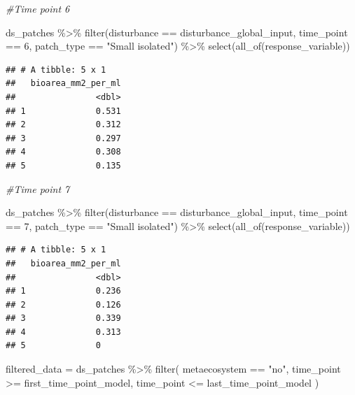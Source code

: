 \documentclass[
]{article}
\newenvironment{Shaded}{\begin{snugshade}}{\end{snugshade}}
\newcommand{\CommentTok}[1]{\textcolor[rgb]{0.56,0.35,0.01}{\textit{#1}}}
\newcommand{\DecValTok}[1]{\textcolor[rgb]{0.00,0.00,0.81}{#1}}
\newcommand{\FunctionTok}[1]{\textcolor[rgb]{0.00,0.00,0.00}{#1}}
\newcommand{\NormalTok}[1]{#1}
\newcommand{\OtherTok}[1]{\textcolor[rgb]{0.56,0.35,0.01}{#1}}
\newcommand{\SpecialCharTok}[1]{\textcolor[rgb]{0.00,0.00,0.00}{#1}}
\newcommand{\StringTok}[1]{\textcolor[rgb]{0.31,0.60,0.02}{#1}}
\begin{document}
\begin{Shaded}
\begin{Highlighting}[]
\CommentTok{\#Time point 6}

\NormalTok{ds\_patches }\SpecialCharTok{\%\textgreater{}\%}
  \FunctionTok{filter}\NormalTok{(disturbance }\SpecialCharTok{==}\NormalTok{ disturbance\_global\_input,}
\NormalTok{         time\_point }\SpecialCharTok{==} \DecValTok{6}\NormalTok{,}
\NormalTok{         patch\_type }\SpecialCharTok{==} \StringTok{"Small isolated"}\NormalTok{) }\SpecialCharTok{\%\textgreater{}\%}
  \FunctionTok{select}\NormalTok{(}\FunctionTok{all\_of}\NormalTok{(response\_variable))}
\end{Highlighting}
\end{Shaded}

\begin{verbatim}
## # A tibble: 5 x 1
##   bioarea_mm2_per_ml
##                <dbl>
## 1              0.531
## 2              0.312
## 3              0.297
## 4              0.308
## 5              0.135
\end{verbatim}

\begin{Shaded}
\begin{Highlighting}[]
\CommentTok{\#Time point 7}

\NormalTok{ds\_patches }\SpecialCharTok{\%\textgreater{}\%}
  \FunctionTok{filter}\NormalTok{(disturbance }\SpecialCharTok{==}\NormalTok{ disturbance\_global\_input,}
\NormalTok{         time\_point }\SpecialCharTok{==} \DecValTok{7}\NormalTok{,}
\NormalTok{         patch\_type }\SpecialCharTok{==} \StringTok{"Small isolated"}\NormalTok{) }\SpecialCharTok{\%\textgreater{}\%}
  \FunctionTok{select}\NormalTok{(}\FunctionTok{all\_of}\NormalTok{(response\_variable))}
\end{Highlighting}
\end{Shaded}

\begin{verbatim}
## # A tibble: 5 x 1
##   bioarea_mm2_per_ml
##                <dbl>
## 1              0.236
## 2              0.126
## 3              0.339
## 4              0.313
## 5              0
\end{verbatim}

\begin{Shaded}
\begin{Highlighting}[]
\NormalTok{filtered\_data }\OtherTok{=}\NormalTok{ ds\_patches }\SpecialCharTok{\%\textgreater{}\%}
  \FunctionTok{filter}\NormalTok{(}
\NormalTok{    metaecosystem }\SpecialCharTok{==} \StringTok{"no"}\NormalTok{,}
\NormalTok{    time\_point }\SpecialCharTok{\textgreater{}=}\NormalTok{ first\_time\_point\_model,}
\NormalTok{    time\_point }\SpecialCharTok{\textless{}=}\NormalTok{ last\_time\_point\_model}
\NormalTok{  )}
\end{Highlighting}
\end{Shaded}
\end{document}
